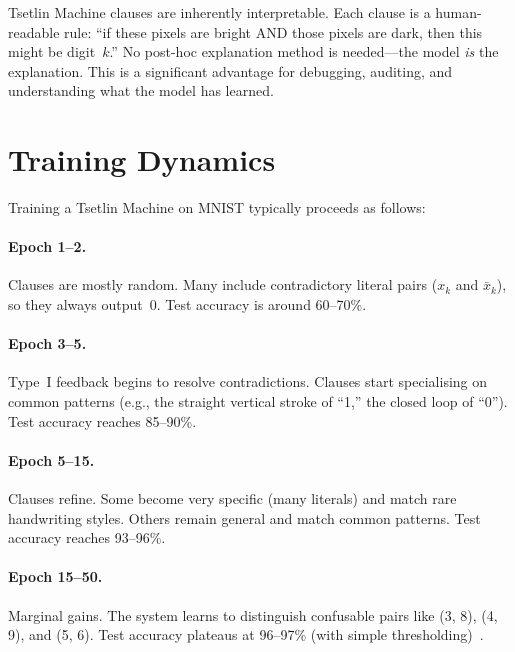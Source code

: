 \begin{keyinsight}
Tsetlin Machine clauses are inherently interpretable. Each clause
is a human-readable rule: ``if these pixels are bright AND those
pixels are dark, then this might be digit~$k$.'' No post-hoc
explanation method is needed---the model \emph{is} the explanation.
This is a significant advantage for debugging, auditing, and
understanding what the model has learned.
\end{keyinsight}


\section{Training Dynamics}
\label{sec:training-dynamics}

Training a Tsetlin Machine on MNIST typically proceeds as follows:

\paragraph{Epoch 1--2.} Clauses are mostly random. Many include
contradictory literal pairs ($x_k$ and $\bar{x}_k$), so they always
output~0. Test accuracy is around 60--70\%.

\paragraph{Epoch 3--5.} Type~I feedback begins to resolve
contradictions. Clauses start specialising on common patterns (e.g.,
the straight vertical stroke of ``1,'' the closed loop of ``0'').
Test accuracy reaches 85--90\%.

\paragraph{Epoch 5--15.} Clauses refine. Some become very specific
(many literals) and match rare handwriting styles. Others remain
general and match common patterns. Test accuracy reaches 93--96\%.

\paragraph{Epoch 15--50.} Marginal gains. The system learns to
distinguish confusable pairs like (3, 8), (4, 9), and (5, 6).
Test accuracy plateaus at 96--97\% (with simple thresholding)~\cite{abeyrathna2021integer}.

